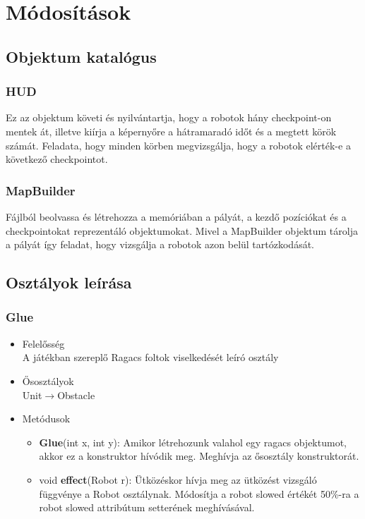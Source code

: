 %
\thispagestyle{fancy}

\setcounter{chapter}{-1}
\chapter{Módosítások}
\section{Objektum katalógus}
\subsection{HUD}
Ez az objektum követi és nyilvántartja, hogy a robotok hány checkpoint-on mentek át, illetve kiírja a képernyőre a hátramaradó időt és a megtett körök számát. Feladata, hogy minden körben megvizsgálja, hogy a robotok elérték-e a következő checkpointot.
\subsection{MapBuilder}
Fájlból beolvassa és létrehozza a memóriában a pályát, a kezdő pozíciókat és a checkpointokat reprezentáló objektumokat.  Mivel a  MapBuilder objektum tárolja a pályát így feladat, hogy vizsgálja a robotok azon belül tartózkodását.  

\section{Osztályok leírása}

\subsection{Glue}
\begin{itemize}
\item Felelősség\\
A játékban szereplő Ragacs foltok viselkedését leíró osztály
\item Ősosztályok\\
Unit$\rightarrow$Obstacle
\item Metódusok
	\begin{itemize}
	    \item \textbf{Glue}(int x, int y): Amikor létrehozunk valahol egy ragacs objektumot, akkor ez a konstruktor hívódik meg. Meghívja az ősosztály konstruktorát.
		\item void \textbf{effect}(Robot r): Ütközéskor hívja meg az ütközést vizsgáló függvénye a Robot osztálynak. Módosítja a robot slowed értékét 50\%-ra a robot slowed attribútum setterének meghívásával.
	\end{itemize}
\end{itemize}

